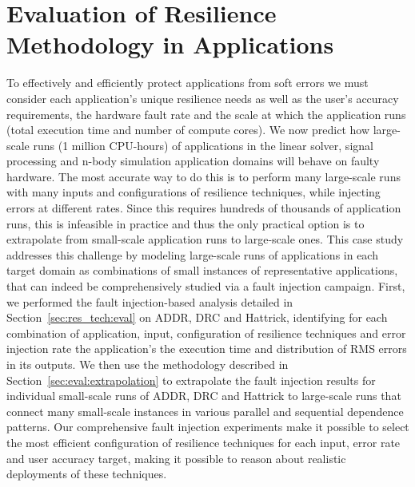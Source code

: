 \documentclass[10pt, conference, compsocconf]{IEEEtran}
\begin{document}
\vspace{-10pt}
\section{Evaluation of Resilience Methodology in Applications}
\vspace{-10pt}
\label{sec:eval}

To effectively and efficiently protect applications from soft errors we must consider each application's unique resilience needs as well as the user's accuracy requirements, the hardware fault rate and the scale at which the application runs (total execution time and number of compute cores).
We now predict how large-scale runs (1 million CPU-hours) of applications in the linear solver, signal processing and n-body simulation application domains will behave on faulty hardware.
The most accurate way to do this is to perform many large-scale runs with many inputs and configurations of resilience techniques, while injecting errors at different rates.
Since this requires hundreds of thousands of application runs, this is infeasible in practice and thus the only practical option is to extrapolate from small-scale application runs to large-scale ones.
This case study addresses this challenge by modeling large-scale runs of applications in each target domain as combinations of small instances of representative applications, that can indeed be comprehensively studied via a fault injection campaign. 
First, we performed the fault injection-based analysis detailed in Section~\ref{sec:res_tech:eval} on ADDR, DRC and Hattrick, identifying for each combination of application, input, configuration of resilience techniques and error injection rate the application's the execution time and distribution of RMS errors in its outputs.
We then use the methodology described in Section~\ref{sec:eval:extrapolation} to extrapolate the fault injection results for individual small-scale runs of ADDR, DRC and Hattrick to large-scale runs that connect many small-scale instances in various parallel and sequential dependence patterns.
Our comprehensive fault injection experiments make it possible to select the most efficient configuration of resilience techniques for each input, error rate and user accuracy target, making it possible to reason about realistic deployments of these techniques.
\end{document}
